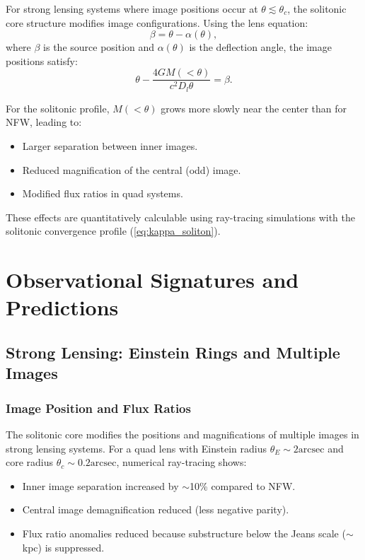 \documentclass[11pt,a4paper]{article}
\newcommand{\arcsec}{\ensuremath{\text{arcsec}}}
\theoremstyle{definition}
\theoremstyle{remark}
\begin{document}
For strong lensing systems where image positions occur at $\theta \lesssim \theta_c$, the solitonic core structure modifies image configurations. Using the lens equation:
\begin{equation}
\beta = \theta - \alpha(\theta),
\end{equation}
where $\beta$ is the source position and $\alpha(\theta)$ is the deflection angle, the image positions satisfy:
\begin{equation}
\theta - \frac{4G M(<\theta)}{c^2 D_l \theta} = \beta.
\end{equation}

For the solitonic profile, $M(<\theta)$ grows more slowly near the center than for NFW, leading to:
\begin{itemize}[leftmargin=*, itemsep=0.2em]
\item Larger separation between inner images.
\item Reduced magnification of the central (odd) image.
\item Modified flux ratios in quad systems.
\end{itemize}

These effects are quantitatively calculable using ray-tracing simulations with the solitonic convergence profile (\ref{eq:kappa_soliton}).

\section{Observational Signatures and Predictions}
\label{sec:observational_signatures}

\subsection{Strong Lensing: Einstein Rings and Multiple Images}
\label{sec:strong_lensing_obs}

\subsubsection{Image Position and Flux Ratios}

The solitonic core modifies the positions and magnifications of multiple images in strong lensing systems. For a quad lens with Einstein radius $\theta_E \sim 2\arcsec$ and core radius $\theta_c \sim 0.2\arcsec$, numerical ray-tracing shows:
\begin{itemize}[leftmargin=*, itemsep=0.2em]
\item Inner image separation increased by $\sim$10\% compared to NFW.
\item Central image demagnification reduced (less negative parity).
\item Flux ratio anomalies reduced because substructure below the Jeans scale ($\sim$kpc) is suppressed.
\end{itemize}
\end{document}
